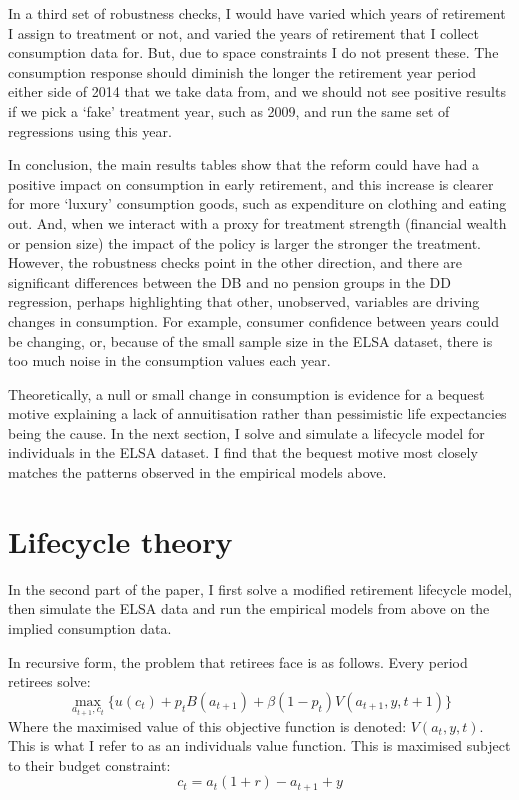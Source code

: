 \documentclass[12pt]{article}
\begin{document}
In a third set of robustness checks, I would have varied which years of
retirement I assign to treatment or not, and varied the years of retirement that
I collect consumption data for. But, due to space constraints I do not present
these. The consumption response should diminish the longer the retirement year
period either side of 2014 that we take data from, and we should not see
positive results if we pick a `fake' treatment year, such as 2009, and run the
same set of regressions using this year.

In conclusion, the main results tables show that the reform could have had a
positive impact on consumption in early retirement, and this increase is clearer
for more `luxury' consumption goods, such as expenditure on clothing and eating
out. And, when we interact with a proxy for treatment strength (financial wealth
or pension size) the impact of the policy is larger the stronger the treatment.
However, the robustness checks point in the other direction, and there are
significant differences between the DB and no pension groups in the DD
regression, perhaps highlighting that other, unobserved, variables are driving
changes in consumption. For example, consumer confidence between years could be
changing, or, because of the small sample size in the ELSA dataset, there is too
much noise in the consumption values each year.

Theoretically, a null or small change in consumption is evidence for a
bequest motive explaining a lack of annuitisation rather than pessimistic life
expectancies being the cause. In the next section, I solve and simulate a
lifecycle model for individuals in the ELSA dataset. I find that the bequest
motive most closely matches the patterns observed in the empirical models above.

\section{Lifecycle theory}

In the second part of the paper, I first solve a modified retirement lifecycle
model, then simulate the ELSA data and run the empirical models from
above on the implied consumption data.

In recursive form, the problem that retirees face is as follows. Every period
retirees solve:
\begin{equation*}
  \label{eq:retirement-problem}
  \underset{a_{t+1}, c_{t}}{\max} \{ u(c_{t}) + p_{t}B(a_{t+1}) + \beta(1-p_{t})V(a_{t+1}, y, t+1) \}
\end{equation*}
Where the maximised value of this objective function is denoted: $V(a_{t}, y,
  t)$. This is what I refer to as an individuals value function.
This is maximised subject to their budget constraint:
\begin{equation*}
  \label{eq:budget-constraint}
  c_{t} =a_{t}(1 +r) -  a_{t+1} + y
\end{equation*}
\end{document}

